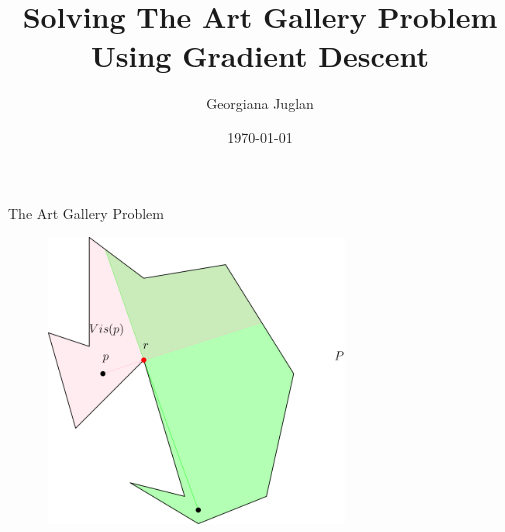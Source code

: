 \documentclass{beamer}
\title{Solving The Art Gallery Problem Using Gradient Descent}
\author{Georgiana Juglan}
\institute{Supervisor: Tillman Miltzow \\ Second Examiner: Frank Staals}
\date{\today}
\begin{document}

\begin{frame}
	\maketitle %
\end{frame}




% 

\begin{frame}{The Art Gallery Problem}
	\begin{figure}
		\centering
		\includegraphics[width = 0.7\textwidth]{Images/p.png}
	\end{figure}
\end{frame}

\end{document}
